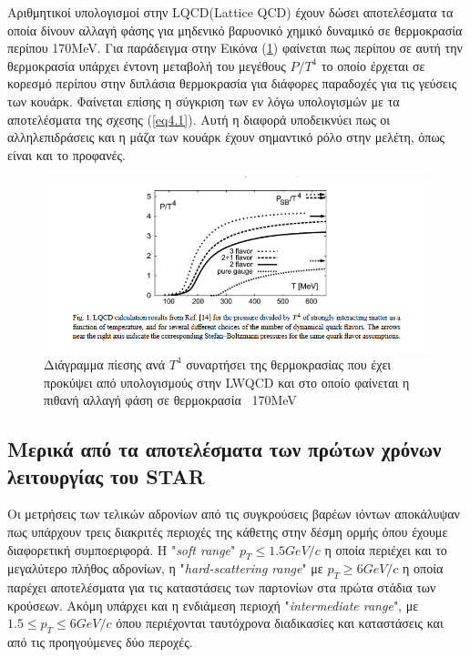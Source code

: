 	
	Αριθμητικοί υπολογισμοί στην LQCD(Lattice QCD) έχουν δώσει αποτελέσματα τα οποία δίνουν αλλαγή φάσης για μηδενικό βαρυονικό χημικό δυναμικό σε θερμοκρασία περίπου 170MeV. Για παράδειγμα στην Εικόνα (\ref{fig4.4}) φαίνεται πως περίπου σε αυτή την θερμοκρασία υπάρχει έντονη μεταβολή του μεγέθους $P/T^4$ το οποίο έρχεται σε κορεσμό περίπου στην διπλάσια θερμοκρασία για διάφορες παραδοχές για τις γεύσεις των κουάρκ. Φαίνεται επίσης η σύγκριση των εν λόγω υπολογισμών με τα αποτελέσματα της σχεσης (\ref{eq4.1}). Αυτή η διαφορά υποδεικνύει πως οι αλληλεπιδράσεις και η μάζα των κουάρκ έχουν σημαντικό ρόλο στην μελέτη, όπως είναι και το προφανές.
	
	
	\begin{figure}[h!]
		\centering
		\includegraphics[scale=0.7]{STAR_Results/Predictions/P_over_T4_diagaram}
		\caption{Διάγραμμα πίεσης ανά $T^4$ συναρτήσει της θερμοκρασίας που έχει προκύψει από υπολογισμούς στην LWQCD και στο οποίο φαίνεται η πιθανή αλλαγή φάση  σε θερμοκρασία ~170MeV}
		\label{fig4.4}
	\end{figure}
	
\subsection{Μερικά από τα αποτελέσματα των πρώτων χρόνων λειτουργίας του STAR}	
	
	Οι μετρήσεις των τελικών αδρονίων από τις συγκρούσεις βαρέων ιόντων αποκάλυψαν πως υπάρχουν τρεις διακριτές περιοχές της κάθετης στην δέσμη ορμής όπου έχουμε διαφορετική συμποεριφορά. Η "\textit{soft range}" $p_T\leq 1.5GeV/c$ η οποία περιέχει και το μεγαλύτερο πλήθος αδρονίων, η "\textit{hard-scattering range}" με $p_T\geq 6GeV/c$ η οποία παρέχει αποτελέσματα για τις καταστάσεις των παρτονίων στα πρώτα στάδια των κρούσεων. Ακόμη υπάρχει και η ενδιάμεση περιοχή "\textit{intermediate range}", με $1.5\leq p_T\leq 6GeV/c$ όπου περιέχονται ταυτόχρονα διαδικασίες και καταστάσεις και από τις προηγούμενες δύο περοχές. 	
	
